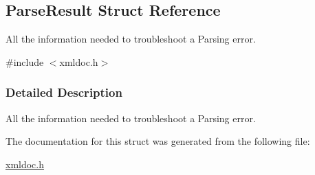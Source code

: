 \hypertarget{structParseResult}{
\subsection{ParseResult Struct Reference}
\label{structParseResult}
}


All the information needed to troubleshoot a Parsing error.  




{\ttfamily \#include $<$xmldoc.h$>$}



\subsubsection{Detailed Description}
All the information needed to troubleshoot a Parsing error. 

The documentation for this struct was generated from the following file:\begin{DoxyCompactItemize}
\item 
\hyperlink{xmldoc_8h}{xmldoc.h}\end{DoxyCompactItemize}
